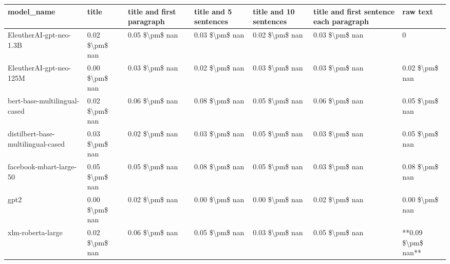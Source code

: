 \begin{tabular}{lllllll}
\toprule
                        model\_name &          title & title and first paragraph & title and 5 sentences & title and 10 sentences & title and first sentence each paragraph &           raw text \\
\midrule
           EleutherAI-gpt-neo-1.3B & 0.02 \$\textbackslash pm\$ nan &            0.05 \$\textbackslash pm\$ nan &        0.03 \$\textbackslash pm\$ nan &         0.02 \$\textbackslash pm\$ nan &                          0.03 \$\textbackslash pm\$ nan &                  0 \\
           EleutherAI-gpt-neo-125M & 0.00 \$\textbackslash pm\$ nan &            0.03 \$\textbackslash pm\$ nan &        0.02 \$\textbackslash pm\$ nan &         0.03 \$\textbackslash pm\$ nan &                          0.03 \$\textbackslash pm\$ nan &     0.02 \$\textbackslash pm\$ nan \\
      bert-base-multilingual-cased & 0.02 \$\textbackslash pm\$ nan &            0.06 \$\textbackslash pm\$ nan &        0.08 \$\textbackslash pm\$ nan &         0.05 \$\textbackslash pm\$ nan &                          0.06 \$\textbackslash pm\$ nan &     0.05 \$\textbackslash pm\$ nan \\
distilbert-base-multilingual-cased & 0.03 \$\textbackslash pm\$ nan &            0.02 \$\textbackslash pm\$ nan &        0.03 \$\textbackslash pm\$ nan &         0.05 \$\textbackslash pm\$ nan &                          0.03 \$\textbackslash pm\$ nan &     0.05 \$\textbackslash pm\$ nan \\
           facebook-mbart-large-50 & 0.05 \$\textbackslash pm\$ nan &            0.05 \$\textbackslash pm\$ nan &        0.08 \$\textbackslash pm\$ nan &         0.05 \$\textbackslash pm\$ nan &                          0.03 \$\textbackslash pm\$ nan &     0.08 \$\textbackslash pm\$ nan \\
                              gpt2 & 0.00 \$\textbackslash pm\$ nan &            0.02 \$\textbackslash pm\$ nan &        0.00 \$\textbackslash pm\$ nan &         0.00 \$\textbackslash pm\$ nan &                          0.02 \$\textbackslash pm\$ nan &     0.00 \$\textbackslash pm\$ nan \\
                 xlm-roberta-large & 0.02 \$\textbackslash pm\$ nan &            0.06 \$\textbackslash pm\$ nan &        0.05 \$\textbackslash pm\$ nan &         0.03 \$\textbackslash pm\$ nan &                          0.05 \$\textbackslash pm\$ nan & **0.09 \$\textbackslash pm\$ nan** \\
\bottomrule
\end{tabular}
